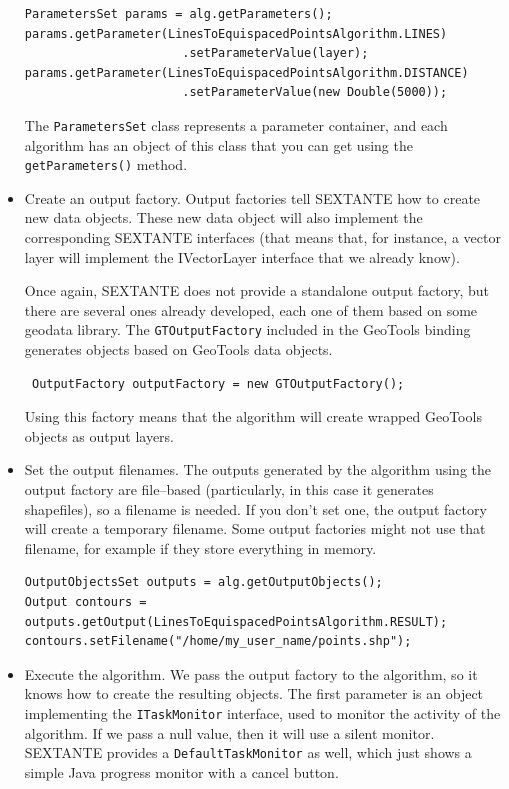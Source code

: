 \begin{itemize}
\begin{verbatim}
ParametersSet params = alg.getParameters();
params.getParameter(LinesToEquispacedPointsAlgorithm.LINES)
                      .setParameterValue(layer);
params.getParameter(LinesToEquispacedPointsAlgorithm.DISTANCE)
                      .setParameterValue(new Double(5000));
\end{verbatim}

The \texttt{ParametersSet} class represents a parameter container, and each algorithm has an object of this class that you can get using the \texttt{getParameters()} method.

\item Create an output factory. Output factories tell SEXTANTE how to create new data objects. These new data object will also implement the corresponding SEXTANTE interfaces (that means that, for instance, a vector layer will implement the IVectorLayer interface that we already know).

Once again, SEXTANTE does not provide a standalone output factory, but there are several ones already developed, each one of them based on some geodata library. The \texttt{GTOutputFactory} included in the GeoTools binding generates objects based on GeoTools data objects.

\begin{verbatim}
 OutputFactory outputFactory = new GTOutputFactory();
\end{verbatim}

Using this factory means that the algorithm will create wrapped GeoTools objects as output layers.

\item Set the output filenames. The outputs generated by the algorithm using the output factory are file--based (particularly, in this case it generates shapefiles), so a filename is needed. If you don't set one, the output factory will create a temporary filename. Some output factories might not use that filename, for example if they store everything in memory.

\begin{verbatim}
OutputObjectsSet outputs = alg.getOutputObjects();
Output contours = outputs.getOutput(LinesToEquispacedPointsAlgorithm.RESULT);
contours.setFilename("/home/my_user_name/points.shp");
\end{verbatim}

\item Execute the algorithm. We pass the output factory to the algorithm, so it knows how to create the resulting objects. The first parameter is an object implementing the \texttt{ITaskMonitor} interface, used to monitor the activity of the algorithm. If we pass a null value, then it will use a silent monitor. SEXTANTE provides a \texttt{DefaultTaskMonitor} as well, which just shows a simple Java progress monitor with a cancel button.


\end{itemize}
